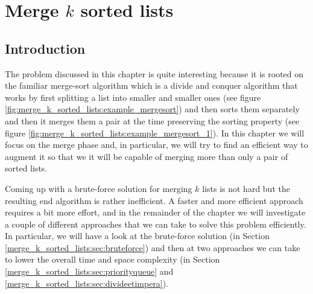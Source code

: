 %



\chapter{Merge $k$ sorted lists}
\label{ch:merge_k_sorted_lists}
\section*{Introduction}
The problem discussed in this chapter is quite interesting because it is rooted on the familiar  merge-sort algorithm\cite{wiki:mergesort} which is a divide and conquer algorithm that works by first splitting a list into smaller and smaller ones (see figure \ref{fig:merge_k_sorted_lists:example_mergesort}) and then sorts them separately and then it merges them a pair at the time preserving the sorting property (see figure \ref{fig:merge_k_sorted_lists:example_mergesort_1}). 
In this chapter we will focus on the merge phase and, in particular, we will try to find an efficient way to augment it so that we it will be capable of merging more than only a pair of sorted lists. 

Coming up with a brute-force solution for merging $k$ lists is not hard but the resulting end algorithm is rather inefficient. 
A faster and more efficient approach requires a bit more effort, and in the remainder of the chapter we will investigate a couple of different approaches that we can take to solve this problem efficiently.
In particular, we will have a look at the brute-force solution (in Section \ref{merge_k_sorted_lists:sec:bruteforce}) and then at two approaches we can take to lower the overall time and space complexity (in Section \ref{merge_k_sorted_lists:sec:priorityqueue} and \ref{merge_k_sorted_lists:sec:divideetimpera}).


